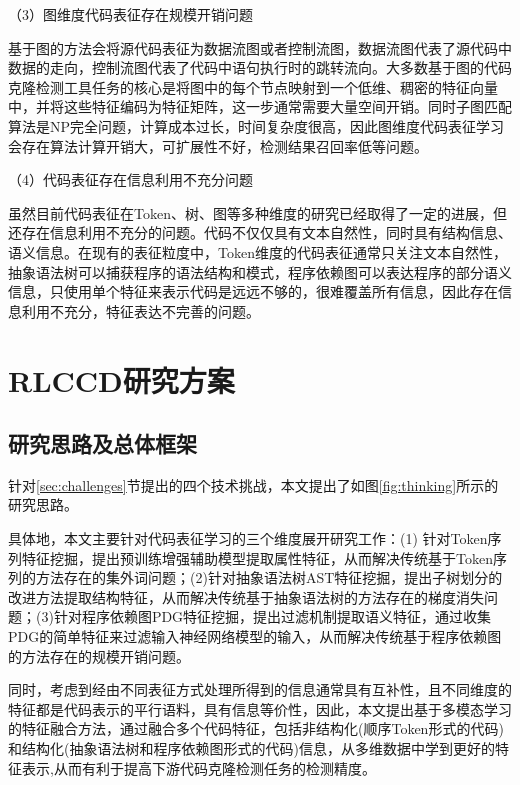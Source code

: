 （3）图维度代码表征存在规模开销问题

基于图的方法会将源代码表征为数据流图或者控制流图，数据流图代表了源代码中数据的走向，控制流图代表了代码中语句执行时的跳转流向。大多数基于图的代码克隆检测工具任务的核心是将图中的每个节点映射到一个低维、稠密的特征向量中，并将这些特征编码为特征矩阵，这一步通常需要大量空间开销。同时子图匹配算法是NP完全问题，计算成本过长，时间复杂度很高，因此图维度代码表征学习会存在算法计算开销大，可扩展性不好，检测结果召回率低等问题。

（4）代码表征存在信息利用不充分问题

虽然目前代码表征在Token、树、图等多种维度的研究已经取得了一定的进展，但还存在信息利用不充分的问题。代码不仅仅具有文本自然性，同时具有结构信息、语义信息。在现有的表征粒度中，Token维度的代码表征通常只关注文本自然性，抽象语法树可以捕获程序的语法结构和模式，程序依赖图可以表达程序的部分语义信息，只使用单个特征来表示代码是远远不够的，很难覆盖所有信息，因此存在信息利用不充分，特征表达不完善的问题。

\section{RLCCD研究方案}
\label{sec:Framework}

\subsection{研究思路及总体框架}
\label{subsec:Ideas}
针对\ref{sec:challenges}节提出的四个技术挑战，本文提出了如图\ref{fig:thinking}所示的研究思路。

具体地，本文主要针对代码表征学习的三个维度展开研究工作：(1) 针对Token序列特征挖掘，提出预训练增强辅助模型提取属性特征，从而解决传统基于Token序列的方法存在的集外词问题；(2)针对抽象语法树AST特征挖掘，提出子树划分的改进方法提取结构特征，从而解决传统基于抽象语法树的方法存在的梯度消失问题；(3)针对程序依赖图PDG特征挖掘，提出过滤机制提取语义特征，通过收集PDG的简单特征来过滤输入神经网络模型的输入，从而解决传统基于程序依赖图的方法存在的规模开销问题。

同时，考虑到经由不同表征方式处理所得到的信息通常具有互补性，且不同维度的特征都是代码表示的平行语料，具有信息等价性，因此，本文提出基于多模态学习的特征融合方法，通过融合多个代码特征，包括非结构化(顺序Token形式的代码)和结构化(抽象语法树和程序依赖图形式的代码)信息，从多维数据中学到更好的特征表示,从而有利于提高下游代码克隆检测任务的检测精度。

